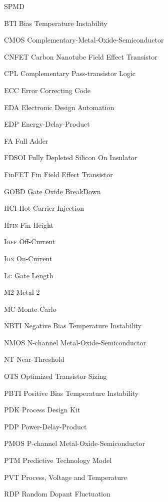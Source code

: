 \documentclass[ecp,tc, english]{iiufrgs}
\begin{document}
\begin{listofabbrv}{SPMD}
        \item[BTI] Bias Temperature Instability
        \item[CMOS] Complementary-Metal-Oxide-Semiconductor
        \item[CNFET] Carbon Nanotube Field Effect Transistor
        \item[CPL] Complementary Pass-transistor Logic
        \item[ECC] Error Correcting Code
        \item[EDA] Electronic Design Automation
        \item[EDP] Energy-Delay-Product
        \item[FA] Full Adder
        \item[FDSOI] Fully Depleted Silicon On Insulator
        \item[FinFET] Fin Field Effect Transistor
        \item[GOBD] Gate Oxide BreakDown
        \item[HCI] Hot Carrier Injection
        \item[H\textsc{fin}] Fin Height
        \item[I\textsc{off}] Off-Current
        \item[I\textsc{on}] On-Current
        \item[L\textsc{g}] Gate Length
        \item[M2] Metal 2
        \item[MC] Monte Carlo
        \item[NBTI] Negative Bias Temperature Instability
        \item[NMOS] N-channel Metal-Oxide-Semiconductor
        \item[NT] Near-Threshold
        \item[OTS] Optimized Transistor Sizing
        \item[PBTI] Positive Bias Temperature Instability
        \item[PDK] Process Design Kit
        \item[PDP] Power-Delay-Product
        \item[PMOS] P-channel Metal-Oxide-Semiconductor
        \item[PTM] Predictive Technology Model
        \item[PVT] Process, Voltage and Temperature
        \item[RDP] Random Dopant Fluctuation

\end{listofabbrv}
\end{document}
